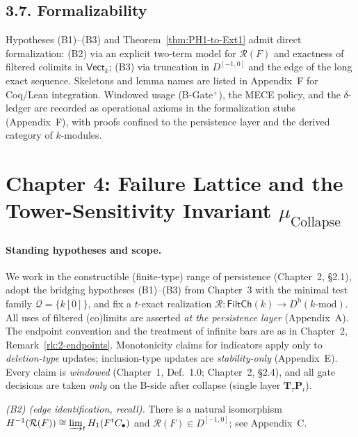 \documentclass[11pt]{article}
\numberwithin{equation}{section}
\theoremstyle{definition}
\begin{document}
\subsection*{3.7. Formalizability}
Hypotheses \textup{(B1)–(B3)} and Theorem~\ref{thm:PH1-to-Ext1} admit direct formalization: \textup{(B2)} via an explicit two-term model for \(\mathcal{R}(F)\) and exactness of filtered colimits in \(\mathsf{Vect}_k\); \textup{(B3)} via truncation in \(D^{[-1,0]}\) and the edge of the long exact sequence. Skeletons and lemma names are listed in Appendix~F for Coq/Lean integration. Windowed usage (B-Gate$^{+}$), the MECE policy, and the $\delta$-ledger are recorded as operational axioms in the formalization stubs (Appendix~F), with proofs confined to the persistence layer and the derived category of $k$-modules.



\section{Chapter 4: Failure Lattice and the Tower-Sensitivity Invariant \texorpdfstring{$\mu_{\mathrm{Collapse}}$}{mu\_Collapse}}

\paragraph{Standing hypotheses and scope.}
We work in the constructible (finite-type) range of persistence (Chapter~2, §2.1), adopt the bridging hypotheses \textup{(B1)–(B3)} from Chapter~3 with the minimal test family $\mathcal{Q}=\{k[0]\}$, and fix a $t$-exact realization $\mathcal{R}:\mathsf{FiltCh}(k)\to D^{\mathrm{b}}(k\text{-mod})$. All uses of filtered (co)limits are asserted \emph{at the persistence layer} (Appendix~A). The endpoint convention and the treatment of infinite bars are as in Chapter~2, Remark~\ref{rk:2-endpoints}. Monotonicity claims for indicators apply only to \emph{deletion-type} updates; inclusion-type updates are \emph{stability-only} (Appendix~E). Every claim is \emph{windowed} (Chapter~1, Def.~1.0; Chapter~2, §2.4), and all gate decisions are taken \emph{only} on the B-side after collapse (single layer $\mathbf{T}_\tau\mathbf{P}_i$).

\medskip
\noindent\emph{(B2) (edge identification, recall).}
There is a natural isomorphism $H^{-1}(\mathcal{R}(F))\cong \varinjlim_t H_1(F^tC_\bullet)$ and $\mathcal{R}(F)\in D^{[-1,0]}$; see Appendix~C.
\end{document}
